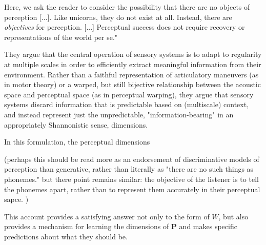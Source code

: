 \begin{multicols}{2}
\begin{leftbar}
Here, we ask the reader to consider the possibility that there are no objects of perception [...]. Like unicorns, they do not exist at all. Instead, there are \textit{objectives} for perception. [...] Perceptual success does not require recovery or representations of the world per se." \cite{kluenderLongstandingProblemsSpeech2019a}
\end{leftbar}

They argue that the central operation of sensory systems is to adapt to regularity at multiple scales in order to efficiently extract meaningful information from their environment. Rather than a faithful representation of articulatory maneuvers (as in motor theory) or a warped, but still bijective relationship between the acoustic space and perceptual space (as in perceptual warping), they argue that sensory systems discard information that is predictable based on (multiscale) context, and instead represent just the unpredictable, "information-bearing" in an appropriately Shannonistic sense, dimensions. 


In this formulation, the perceptual dimensions \

(perhaps this should be read more as an endorsement of discriminative models of perception than generative, rather than literally as "there are no such things as phonemes." but there point remains similar: the objective of the listener is to tell the phonemes apart, rather than to represent them accurately in their perceptual sapce. )

This account provides a satisfying answer not only to the form of $W$, but also provides a mechanism for learning the dimensions of $\mathbf{P}$ and makes specific predictions about what they should be. 




\end{multicols}
